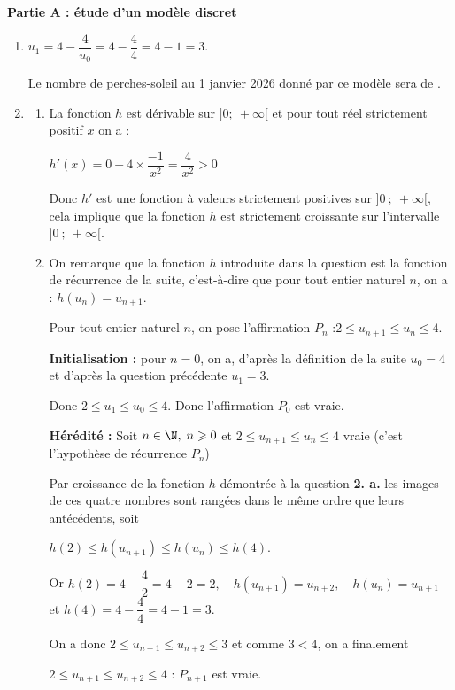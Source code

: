 \textbf{Partie A : étude d'un modèle discret}
	
	\begin{enumerate}
	\item $u_{1}=4-\dfrac{4}{u_{0}}= 4 - \dfrac{4}{4}=4-1=3$.

Le nombre de perches-soleil au 1 janvier 2026 donné par ce modèle sera de .

\item 
	\begin{enumerate}
		\item La fonction $h$ est dérivable sur $] 0;~+\infty[$ et pour tout réel strictement positif $x$ on a :

$h'(x) = 0 -4 \times \dfrac{-1}{x^2}= \dfrac{4}{x^2} > 0$

Donc $h'$ est une fonction à valeurs strictement positives sur $]0~;~+\infty[$, cela implique que la fonction $h$ est strictement croissante sur l'intervalle $]0~;~+\infty[$.
		\item On remarque que la fonction $h$ introduite dans la question est la fonction de récurrence de la suite, c'est-à-dire que pour tout entier naturel $n$, on a : \quad $h(u_n) = u_{n+1}$.

Pour tout entier naturel $n$, on pose l'affirmation $P_n$ :\quad \og $2 \leqslant u_{n+1} \leqslant u_{n} \leqslant 4$.\fg{}

\textbf{Initialisation : } pour $n = 0$, on a, d'après la définition de la suite $u_0 = 4$ et d'après la question précédente $u_1 = 3$.

Donc \quad $2 \leqslant u_1 \leqslant u_0 \leqslant 4$. \quad Donc l'affirmation $P_0$ est vraie.

\textbf{Hérédité :} Soit $n\in \N, \; n \geqslant 0$ et $2 \leqslant u_{n+1} \leqslant u_{n} \leqslant 4$ vraie (c'est l'hypothèse de récurrence $P_n$)

Par croissance de la fonction $h$ démontrée à la question \textbf{2. a.} les images de ces quatre nombres sont rangées dans le même ordre que leurs antécédents, soit

$h(2) \leqslant h(u_{n+1}) \leqslant h(u_n) \leqslant h(4)$.

Or $h(2) = 4 - \dfrac42  = 4 - 2 = 2, \quad h(u_{n+1}) = u_{n+2}, \quad h(u_n) = u_{n+1}$ et \quad $h(4) = 4 - \dfrac 44 = 4 - 1 = 3$.

On a donc $2 \leqslant u_{n+1} \leqslant u_{n+2} \leqslant 3$ et comme $3 < 4$, on a finalement 

$2 \leqslant u_{n+1} \leqslant u_{n+2} \leqslant 4$ : $P_{n+1}$ est vraie.

















\end{enumerate}
\end{enumerate}
